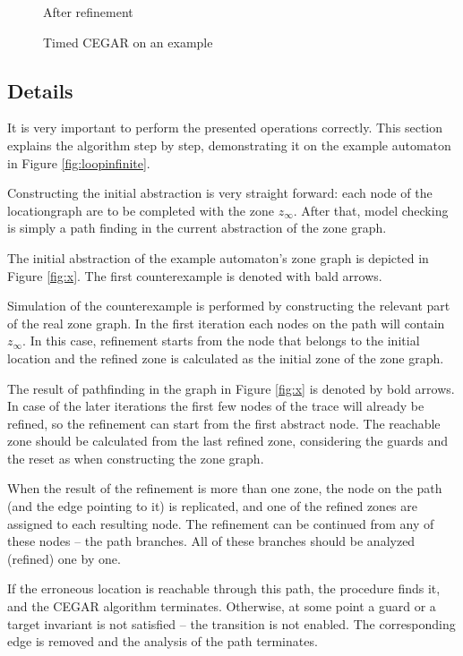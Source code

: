 \begin{figure} [h]
\begin{minipage} {0.25\linewidth}
 		\vspace*{5pt}%
 		\caption{After refinement}
 		\label{fig:loopref}
 	\end{minipage}
 	\caption{Timed CEGAR on an example}
 \end{figure}
 
 
\subsection{Details}

It is very important to perform the presented operations correctly. This section explains the algorithm step by step, demonstrating it on the example automaton in Figure \ref{fig:loopinfinite}.

Constructing the initial abstraction is very straight forward: each node of the locationgraph are to be completed with the zone $z_\infty$. After that, model checking is simply a path finding in the current abstraction of the zone graph.

\begin{example}
	The initial abstraction of the example automaton's zone graph is depicted in Figure \ref{fig:x}. The first counterexample is denoted with bald arrows.
\end{example}

Simulation of the counterexample is performed by constructing the relevant part of the real zone graph. In the first iteration each nodes on the path will contain $z_\infty$. In this case, refinement starts from the node that belongs to the initial location and the refined zone is calculated as the initial zone of the zone graph.

The result of pathfinding in the graph in Figure \ref{fig:x} is denoted by bold arrows. In case of the later iterations the first few nodes of the
trace will already be refined, so the refinement can start from the first
abstract node. The reachable zone should be calculated from the last refined zone,
considering the guards and the reset as when constructing the zone graph.

When the result of the refinement is more than one zone, the node on the path (and the edge pointing
to it) is replicated, and one of the refined zones are assigned
to each resulting node. The refinement can be continued from any of these nodes -- the path branches.
All of these branches should be analyzed (refined) one by one.

If the erroneous location is reachable through this path, the procedure finds it,
and the CEGAR algorithm terminates. Otherwise, at some point a guard or a target invariant
is not satisfied -- the transition is not enabled. The corresponding edge is removed and the analysis of the path terminates.

